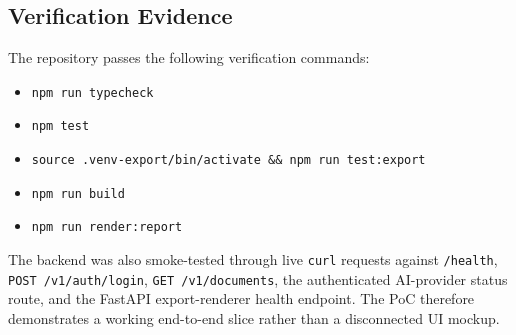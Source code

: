 \subsection{Verification Evidence}

The repository passes the following verification commands:

\begin{itemize}[leftmargin=1.3em]
    \item \texttt{npm run typecheck}
    \item \texttt{npm test}
    \item \texttt{source .venv-export/bin/activate \&\& npm run test:export}
    \item \texttt{npm run build}
    \item \texttt{npm run render:report}
\end{itemize}

The backend was also smoke-tested through live \texttt{curl} requests against \texttt{/health}, \texttt{POST /v1/auth/login}, \texttt{GET /v1/documents}, the authenticated AI-provider status route, and the FastAPI export-renderer health endpoint. The PoC therefore demonstrates a working end-to-end slice rather than a disconnected UI mockup.
